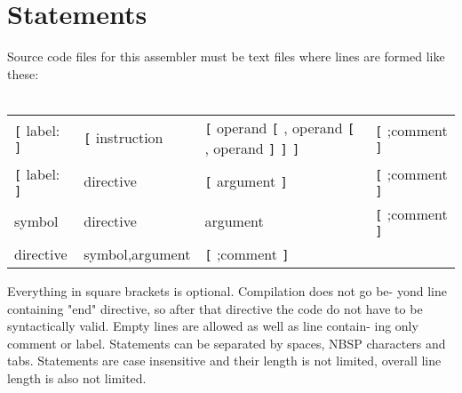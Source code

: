         \section{Statements}
        Source code files for this assembler must be text files where lines are formed like these:\\
                \\ {
                \texttt{}
                \begin{tabular}[h!]{llll}
                        \verb'[' { \color{highlight_label} label: } \verb']' &
                        \verb'[' { \color{highlight_instruction} instruction } &
                        \verb'[' { \color{highlight_symbol} operand } \verb'[' , { \color{highlight_symbol} operand } \verb'[' , { \color{highlight_symbol} operand } \verb']' \verb']' \verb']' &
                        \verb'[' { \color{highlight_comment} ;comment } \verb']' \\

                        \verb'[' { \color{highlight_label} label: } \verb']' &
                        { \color{highlight_directive} directive } &
                        \verb'[' { \color{highlight_symbol} argument } \verb']' &
                        \verb'[' { \color{highlight_comment} ;comment } \verb']' \\

                        { \color{highlight_constant} symbol } &
                        { \color{highlight_directive} directive } &
                        { \color{highlight_symbol} argument } &
                        \verb'[' { \color{highlight_comment} ;comment } \verb']' \\

                        { \color{highlight_directive} directive } &
                        { \color{highlight_constant} symbol,argument } &
                         \verb'[' { \color{highlight_comment} ;comment } \verb']' \\
                \end{tabular}
                    }
                \bigskip
        Everything in square brackets is optional. Compilation does not go be-
        yond line containing "end" directive, so after that directive the code do not
        have to be syntactically valid. Empty lines are allowed as well as line contain-
        ing only comment or label. Statements can be separated by spaces, NBSP
        characters and tabs. Statements are case insensitive and their length is not
        limited, overall line length is also not limited.

